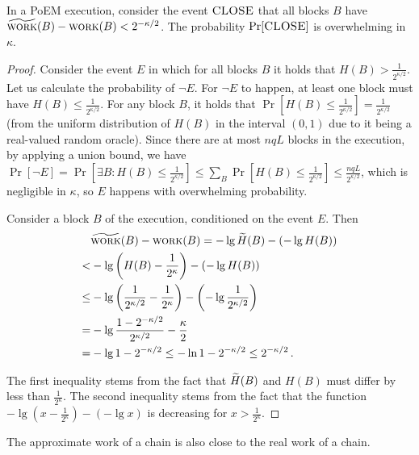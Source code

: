\begin{lemma}\label{lem:block-work-approximation}
  In a PoEM execution, consider the event $\textsc{CLOSE}$ that all blocks $B$
  have $\widetilde{\textsc{work}}(B) - \textsc{work}(B) < 2^{-\kappa/2}$.
  The probability $\Pr[\textsc{CLOSE}]$ is overwhelming in $\kappa$.
\end{lemma}
\begin{proof}
  Consider the event $E$ in which for all blocks $B$ it holds that
  $H(B) > \frac{1}{2^{\kappa/2}}$.
  Let us calculate the probability of $\lnot E$. For $\lnot E$ to happen,
  at least one block must have $H(B) \leq \frac{1}{2^{\kappa/2}}$.
  For any block $B$, it holds that $\Pr[H(B) \leq \frac{1}{2^{\kappa/2}}] = \frac{1}{2^{\kappa/2}}$ (from the
  uniform distribution of $H(B)$ in the interval $(0, 1)$ due to it being a real-valued random oracle).
  Since there are at most $nqL$ blocks in the execution, by applying a union bound, we have
  $\Pr[\lnot E] = \Pr[\exists B: H(B) \leq \frac{1}{2^{\kappa/2}}] \leq \sum_B \Pr[H(B) \leq \frac{1}{2^{\kappa/2}}] \leq \frac{nqL}{2^{\kappa/2}}$,
  which is negligible in $\kappa$,
  so $E$ happens with overwhelming probability.

  Consider a block $B$ of the execution, conditioned on the event $E$.
  Then
  \begin{align*}
        &\widetilde{\textsc{work}}(B) - \textsc{work}(B) = -\lg \widetilde{H}(B) - (-\lg H(B))\\
       <& -\lg\left(H(B) - \frac{1}{2^\kappa}\right) - (-\lg H(B))\\
    \leq& -\lg\left(\frac{1}{2^{\kappa/2}} - \frac{1}{2^\kappa}\right) - \left(-\lg{\frac{1}{2^{\kappa/2}}}\right)\\
       =& -\lg\frac{1 - 2^{-\kappa/2}}{2^{\kappa/2}} - \frac{\kappa}{2} \\
       =& -\lg{1 - 2^{-\kappa/2}} \leq -\ln{1 - 2^{-\kappa/2}} \leq 2^{-\kappa/2}\,.
  \end{align*}

  The first inequality stems from the fact that $\widetilde{H}(B)$ and $H(B)$ must
  differ by less than $\frac{1}{2^\kappa}$. The second inequality stems from
  the fact that the function $-\lg\left(x - \frac{1}{2^\kappa}\right) - (-\lg x)$ is
  decreasing for $x > \frac{1}{2^\kappa}$.
  \Qed
\end{proof}

The approximate work of a chain is also close to the real work of a chain.

